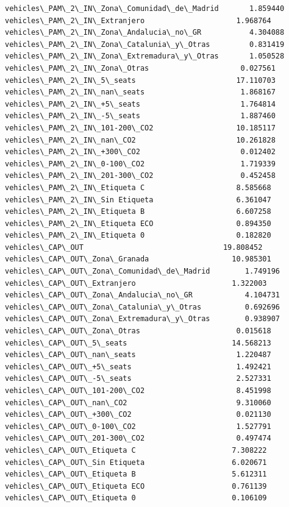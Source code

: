 \documentclass[11pt]{article}
\begin{document}
\begin{Verbatim}[commandchars=\\\{\}]
vehicles\_PAM\_2\_IN\_Zona\_Comunidad\_de\_Madrid       1.859440
vehicles\_PAM\_2\_IN\_Extranjero                     1.968764
vehicles\_PAM\_2\_IN\_Zona\_Andalucia\_no\_GR           4.304088
vehicles\_PAM\_2\_IN\_Zona\_Catalunia\_y\_Otras         0.831419
vehicles\_PAM\_2\_IN\_Zona\_Extremadura\_y\_Otras       1.050528
vehicles\_PAM\_2\_IN\_Zona\_Otras                     0.027561
vehicles\_PAM\_2\_IN\_5\_seats                       17.110703
vehicles\_PAM\_2\_IN\_nan\_seats                      1.868167
vehicles\_PAM\_2\_IN\_+5\_seats                       1.764814
vehicles\_PAM\_2\_IN\_-5\_seats                       1.887460
vehicles\_PAM\_2\_IN\_101-200\_CO2                   10.185117
vehicles\_PAM\_2\_IN\_nan\_CO2                       10.261828
vehicles\_PAM\_2\_IN\_+300\_CO2                       0.012402
vehicles\_PAM\_2\_IN\_0-100\_CO2                      1.719339
vehicles\_PAM\_2\_IN\_201-300\_CO2                    0.452458
vehicles\_PAM\_2\_IN\_Etiqueta C                     8.585668
vehicles\_PAM\_2\_IN\_Sin Etiqueta                   6.361047
vehicles\_PAM\_2\_IN\_Etiqueta B                     6.607258
vehicles\_PAM\_2\_IN\_Etiqueta ECO                   0.894350
vehicles\_PAM\_2\_IN\_Etiqueta 0                     0.182820
vehicles\_CAP\_OUT                                19.808452
vehicles\_CAP\_OUT\_Zona\_Granada                   10.985301
vehicles\_CAP\_OUT\_Zona\_Comunidad\_de\_Madrid        1.749196
vehicles\_CAP\_OUT\_Extranjero                      1.322003
vehicles\_CAP\_OUT\_Zona\_Andalucia\_no\_GR            4.104731
vehicles\_CAP\_OUT\_Zona\_Catalunia\_y\_Otras          0.692696
vehicles\_CAP\_OUT\_Zona\_Extremadura\_y\_Otras        0.938907
vehicles\_CAP\_OUT\_Zona\_Otras                      0.015618
vehicles\_CAP\_OUT\_5\_seats                        14.568213
vehicles\_CAP\_OUT\_nan\_seats                       1.220487
vehicles\_CAP\_OUT\_+5\_seats                        1.492421
vehicles\_CAP\_OUT\_-5\_seats                        2.527331
vehicles\_CAP\_OUT\_101-200\_CO2                     8.451998
vehicles\_CAP\_OUT\_nan\_CO2                         9.310060
vehicles\_CAP\_OUT\_+300\_CO2                        0.021130
vehicles\_CAP\_OUT\_0-100\_CO2                       1.527791
vehicles\_CAP\_OUT\_201-300\_CO2                     0.497474
vehicles\_CAP\_OUT\_Etiqueta C                      7.308222
vehicles\_CAP\_OUT\_Sin Etiqueta                    6.020671
vehicles\_CAP\_OUT\_Etiqueta B                      5.612311
vehicles\_CAP\_OUT\_Etiqueta ECO                    0.761139
vehicles\_CAP\_OUT\_Etiqueta 0                      0.106109

\end{Verbatim}
\end{document}

